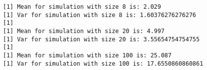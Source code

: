 {
\begin{verbatim}
[1] Mean for simulation with size 8 is: 2.029
[1] Var for simulation with size 8 is: 1.60376276276276
[1]
[1] Mean for simulation with size 20 is: 4.997
[1] Var for simulation with size 20 is: 3.55654754754755
[1]
[1] Mean for simulation with size 100 is: 25.087
[1] Var for simulation with size 100 is: 17.6550860860861
\end{verbatim}
}
